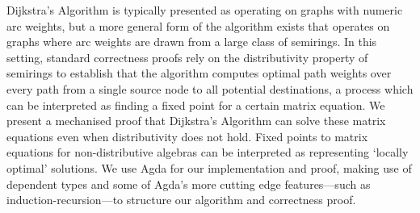 Dijkstra's Algorithm is typically presented as operating on graphs with numeric arc weights, but a more general form of the algorithm exists that operates on graphs where arc weights are drawn from a large class of semirings.
In this setting, standard correctness proofs rely on the distributivity property of semirings to establish that the algorithm computes optimal path weights over every path from a single source node to all potential destinations, a process which can be interpreted as finding a fixed point for a certain matrix equation.
We present a mechanised proof that Dijkstra's Algorithm can solve these matrix equations even when distributivity does not hold.
Fixed points to matrix equations for non-distributive algebras can be interpreted as representing `locally optimal' solutions.
We use Agda for our implementation and proof, making use of dependent types and some of Agda's more cutting edge features---such as induction-recursion---to structure our algorithm and correctness proof.

